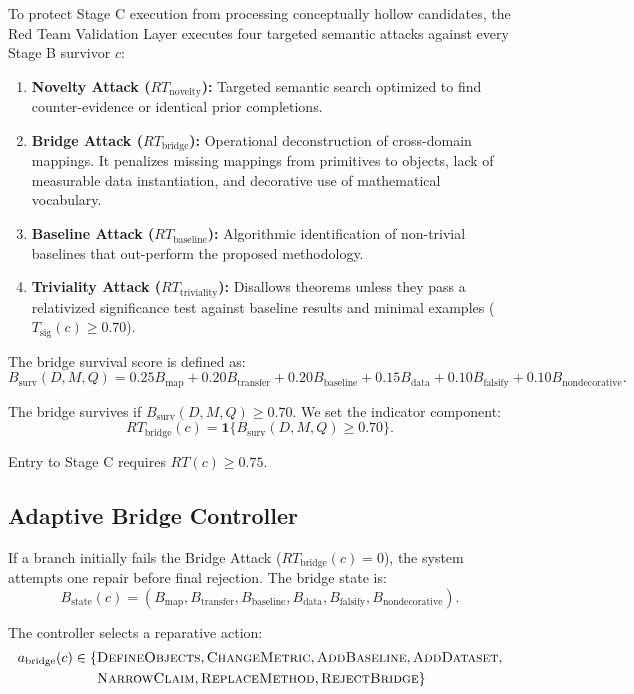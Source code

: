 \documentclass[11pt]{article}
\begin{document}
To protect Stage C execution from processing conceptually hollow candidates, the Red Team Validation Layer executes four targeted semantic attacks against every Stage B survivor $c$:

\begin{enumerate}[leftmargin=*]
    \item \textbf{Novelty Attack ($RT_{\text{novelty}}$):} Targeted semantic search optimized to find counter-evidence or identical prior completions.
    \item \textbf{Bridge Attack ($RT_{\text{bridge}}$):} Operational deconstruction of cross-domain mappings. It penalizes missing mappings from primitives to objects, lack of measurable data instantiation, and decorative use of mathematical vocabulary. 
    \item \textbf{Baseline Attack ($RT_{\text{baseline}}$):} Algorithmic identification of non-trivial baselines that out-perform the proposed methodology.
    \item \textbf{Triviality Attack ($RT_{\text{triviality}}$):} Disallows theorems unless they pass a relativized significance test against baseline results and minimal examples ($T_{\text{sig}}(c) \geq 0.70$).
\end{enumerate}

The bridge survival score is defined as:
$$
B_{\text{surv}}(D,M,Q) = 0.25B_{\text{map}} + 0.20B_{\text{transfer}} + 0.20B_{\text{baseline}} + 0.15B_{\text{data}} + 0.10B_{\text{falsify}} + 0.10B_{\text{nondecorative}}.
$$

The bridge survives if $B_{\text{surv}}(D,M,Q) \geq 0.70$. We set the indicator component:
$$
RT_{\text{bridge}}(c) = \mathbf{1}\{B_{\text{surv}}(D,M,Q) \geq 0.70\}.
$$

Entry to Stage C requires $RT(c) \ge 0.75$.

\subsection{Adaptive Bridge Controller}

If a branch initially fails the Bridge Attack ($RT_{\text{bridge}}(c) = 0$), the system attempts one repair before final rejection. The bridge state is:
$$
B_{\text{state}}(c) = (B_{\text{map}}, B_{\text{transfer}}, B_{\text{baseline}}, B_{\text{data}}, B_{\text{falsify}}, B_{\text{nondecorative}}).
$$

The controller selects a reparative action:
$$
\begin{aligned}
a_{\text{bridge}}(c) \in \{ & \textsc{DefineObjects}, \textsc{ChangeMetric}, \textsc{AddBaseline}, \textsc{AddDataset}, \\
& \textsc{NarrowClaim}, \textsc{ReplaceMethod}, \textsc{RejectBridge} \}
\end{aligned}
$$
\end{document}
